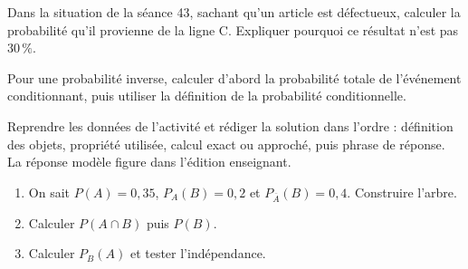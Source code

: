     \begin{activite}
    Dans la situation de la séance 43, sachant qu'un article est défectueux, calculer la probabilité qu'il provienne de la ligne C. Expliquer pourquoi ce résultat n'est pas $30\,\%$.
    \begin{center}\end{center}
    \end{activite}

    \begin{traceecrite}Pour une probabilité inverse, calculer d'abord la probabilité totale de l'événement conditionnant, puis utiliser la définition de la probabilité conditionnelle.\end{traceecrite}

    \begin{exemple}
    Reprendre les données de l'activité et rédiger la solution dans l'ordre : définition des objets, propriété utilisée, calcul exact ou approché, puis phrase de réponse. La réponse modèle figure dans l'édition enseignant.
    \end{exemple}

    \begin{exercice}[-- essentiel]
    \begin{enumerate}\item On sait $P(A)=0{,}35$, $P_A(B)=0{,}2$ et $P_{\overline A}(B)=0{,}4$. Construire l'arbre.\item Calculer $P(A\cap B)$ puis $P(B)$.\item Calculer $P_B(A)$ et tester l'indépendance.\end{enumerate}
    \end{exercice}


